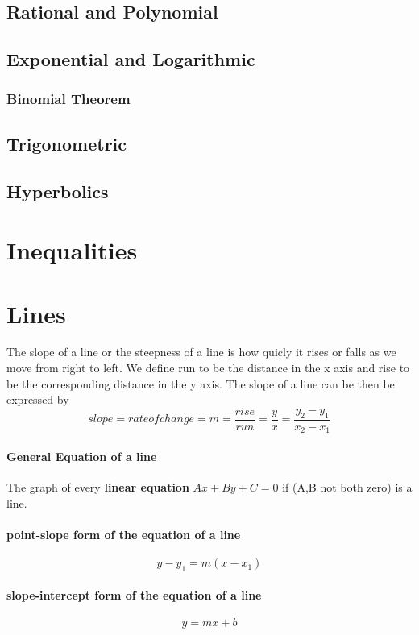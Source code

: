 \documentclass[a4paper,11pt]{book}
\begin{document}
\section{Rational and Polynomial}
\section{Exponential and Logarithmic}
\subsection{Binomial Theorem}
\section{Trigonometric}
\section{Hyperbolics}
\chapter{Inequalities}
\chapter{Lines}
The slope of a line or the steepness of a line is how quicly it rises or falls as we move from right to left. We define run to be the distance in the x axis and rise to be the corresponding distance in the y axis. The slope of a line can be then be expressed by
$$ slope = rate of change = m = \frac{rise}{run} = \frac{y}{x} = \frac{y_2-y_1}{x_2-x_1}$$

\subsubsection{General Equation of a line}
The graph of every \textbf{linear equation} $Ax+By+C=0$ if (A,B not both zero) is a line. 
\subsubsection{point-slope form of the equation of a line}
$$ y-y_1=m(x-x_1)$$
\subsubsection{slope-intercept form of the equation of a line}
$$y=mx+b$$
\end{document}
